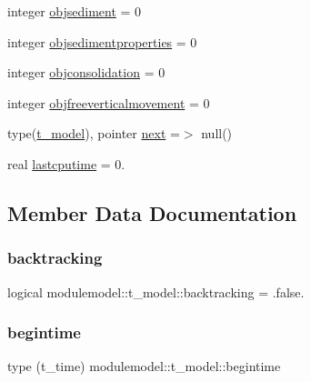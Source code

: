 \begin{DoxyCompactItemize}
\item 
integer \mbox{\hyperlink{structmodulemodel_1_1t__model_aae8c978d928530d81fea5b1b9927cb60}{objsediment}} = 0
\item 
integer \mbox{\hyperlink{structmodulemodel_1_1t__model_a80132555d1368ec71b98b776bceef484}{objsedimentproperties}} = 0
\item 
integer \mbox{\hyperlink{structmodulemodel_1_1t__model_a3e2da1da03e398178d91e78d6b1115a7}{objconsolidation}} = 0
\item 
integer \mbox{\hyperlink{structmodulemodel_1_1t__model_a2f4ff6fbecc5b1cb78080d9efe87e6d1}{objfreeverticalmovement}} = 0
\item 
type(\mbox{\hyperlink{structmodulemodel_1_1t__model}{t\+\_\+model}}), pointer \mbox{\hyperlink{structmodulemodel_1_1t__model_ac035a58c624504d347162b9d27e5237f}{next}} =$>$ null()
\item 
real \mbox{\hyperlink{structmodulemodel_1_1t__model_aa4129cf63f4257f24865777bfab48f56}{lastcputime}} = 0.
\end{DoxyCompactItemize}


\subsection{Member Data Documentation}
\mbox{\label{structmodulemodel_1_1t__model_aff034f47ca46649bb72f4b7694b23378}} 
\subsubsection{\texorpdfstring{backtracking}{backtracking}}
{\footnotesize\ttfamily logical modulemodel\+::t\+\_\+model\+::backtracking = .false.\hspace{0.3cm}{\ttfamily [private]}}

\mbox{\label{structmodulemodel_1_1t__model_a7c04d7ca0dd9c4fe0fbdd0bd4f7e973b}} 
\subsubsection{\texorpdfstring{begintime}{begintime}}
{\footnotesize\ttfamily type (t\+\_\+time) modulemodel\+::t\+\_\+model\+::begintime\hspace{0.3cm}{\ttfamily [private]}}


